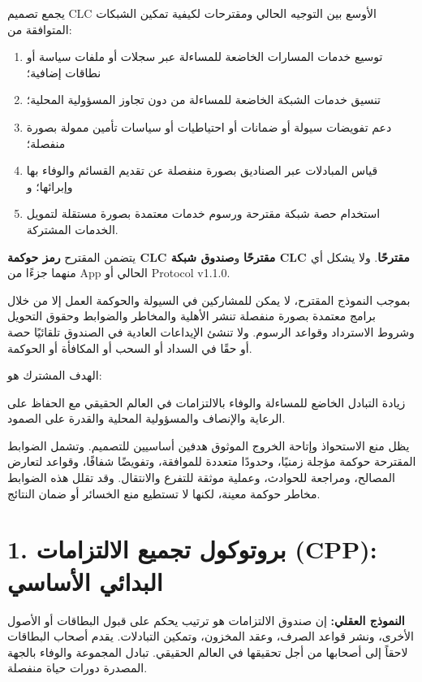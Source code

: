 \documentclass[11pt]{article}
\begin{document}
يجمع تصميم CLC الأوسع بين التوجيه الحالي ومقترحات لكيفية تمكين الشبكات المتوافقة من:

\begin{enumerate}[leftmargin=*]
\item توسيع خدمات المسارات الخاضعة للمساءلة عبر سجلات أو ملفات سياسة أو نطاقات إضافية؛
\item تنسيق خدمات الشبكة الخاضعة للمساءلة من دون تجاوز المسؤولية المحلية؛
\item دعم تفويضات سيولة أو ضمانات أو احتياطيات أو سياسات تأمين ممولة بصورة منفصلة؛
\item قياس المبادلات عبر الصناديق بصورة منفصلة عن تقديم القسائم والوفاء بها وإبرائها؛ و
\item استخدام حصة شبكة مقترحة ورسوم خدمات معتمدة بصورة مستقلة لتمويل الخدمات المشتركة.
\end{enumerate}
يتضمن المقترح \textbf{رمز حوكمة CLC مقترحًا} و\textbf{صندوق شبكة CLC مقترحًا}. ولا يشكل أي منهما جزءًا من App الحالي أو Protocol v1.1.0.

بموجب النموذج المقترح، لا يمكن للمشاركين في السيولة والحوكمة العمل إلا من خلال برامج معتمدة بصورة منفصلة تنشر الأهلية والمخاطر والضوابط وحقوق التحويل وشروط الاسترداد وقواعد الرسوم. ولا تنشئ الإيداعات العادية في الصندوق تلقائيًا حصة أو حقًا في السداد أو السحب أو المكافأة أو الحوكمة.

الهدف المشترك هو:

زيادة التبادل الخاضع للمساءلة والوفاء بالالتزامات في العالم الحقيقي مع الحفاظ على الرعاية والإنصاف والمسؤولية المحلية والقدرة على الصمود.

يظل منع الاستحواذ وإتاحة الخروج الموثوق هدفين أساسيين للتصميم. وتشمل الضوابط المقترحة حوكمة مؤجلة زمنيًا، وحدودًا متعددة للموافقة، وتفويضًا شفافًا، وقواعد لتعارض المصالح، ومراجعة للحوادث، وعملية موثقة للتفرع والانتقال. وقد تقلل هذه الضوابط مخاطر حوكمة معينة، لكنها لا تستطيع منع الخسائر أو ضمان النتائج.


\section*{1. بروتوكول تجميع الالتزامات (CPP): البدائي الأساسي}

\textbf{النموذج العقلي:} إن صندوق الالتزامات هو ترتيب يحكم على قبول البطاقات أو الأصول الأخرى، ونشر قواعد الصرف، وعقد المخزون، وتمكين التبادلات. يقدم أصحاب البطاقات لاحقاً إلى أصحابها من أجل تحقيقها في العالم الحقيقي. تبادل المجموعة والوفاء بالجهة المصدرة دورات حياة منفصلة.
\end{document}
